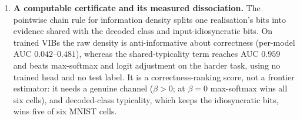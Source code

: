 \documentclass[11pt]{article}
\begin{document}
\begin{enumerate}
nothing under a relative-entropy rate with a matched prior; on a nonatomic (Gaussian) code the
relaxation is \emph{exact}, by the partition theorem of \citet{dvoretzky1951}. The gap is thus an
artefact of discretising a continuous latent --- which is what the ladder experiments do.
\item \textbf{A computable certificate and its measured dissociation.} The pointwise chain rule
for information density \citep{hellstrom2021,verdu2012} splits one realisation's bits into
evidence shared with the decoded class and input-idiosyncratic bits. On trained VIBs the raw
density is anti-informative about correctness (per-model AUC $0.042$--$0.481$), whereas the
shared-typicality term reaches AUC $0.959$ and beats max-softmax and logit adjustment on the
harder task, using no trained head and no test label. It is a correctness-ranking score, not a
frontier estimator: it needs a genuine channel ($\beta>0$; at $\beta=0$ max-softmax wins all six
cells), and decoded-class typicality, which keeps the idiosyncratic bits, wins five of six MNIST
cells.
\end{enumerate}
\end{document}
